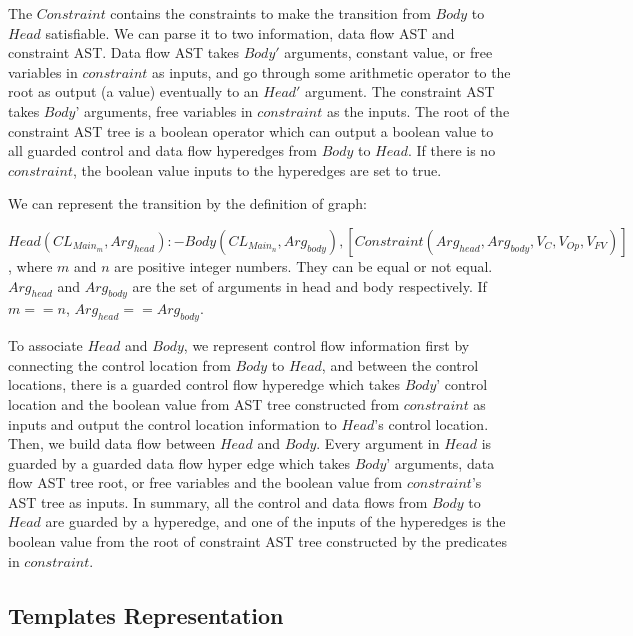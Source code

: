 \documentclass{article}
\begin{document}
The $Constraint$ contains the constraints to make the transition from $Body$ to $Head$ satisfiable. We can parse it to two information, data flow AST and constraint AST.  Data flow AST takes $Body'$ arguments, constant value, or free variables in $constraint$ as inputs, and go through some arithmetic operator to the root as output (a value) eventually to an $Head'$ argument. The constraint AST takes $Body$' arguments, free variables in $constraint$ as the inputs. The root of the constraint AST tree is a boolean operator which can output a boolean value to all guarded control and data flow hyperedges from $Body$ to $Head$. If there is no $constraint$, the boolean value inputs to the hyperedges are set to true.

We can represent the transition by the definition of graph:


$Head(CL_{Main_{m}},Arg_{head}):-Body(CL_{Main_{n}},Arg_{body}),[Constraint(Arg_{head},Arg_{body},V_{C},V_{Op},V_{FV})]$, where $m$ and $n$ are positive integer numbers. They can be equal or not equal. $Arg_{head}$ and $Arg_{body}$ are the set of arguments in head and body respectively. If $m==n$, $Arg_{head} == Arg_{body}$.

To associate $Head$ and $Body$, we represent control flow information first by connecting the control location from $Body$ to $Head$, and between the control locations, there is a guarded control flow hyperedge which takes $Body$' control location and the boolean value from AST tree constructed from $constraint$ as inputs and output the control location information to $Head$'s control location. Then, we build data flow between $Head$ and $Body$. Every argument in $Head$ is guarded by a guarded data flow hyper edge which takes $Body$' arguments, data flow AST tree root, or free variables and the boolean value from $constraint$'s AST tree as inputs. In summary, all the control and data flows from $Body$ to $Head$ are guarded by a hyperedge, and one of the inputs of the hyperedges is the boolean value from the root of constraint AST tree constructed by the predicates in $constraint$. 





\subsection{Templates Representation}
\end{document}
